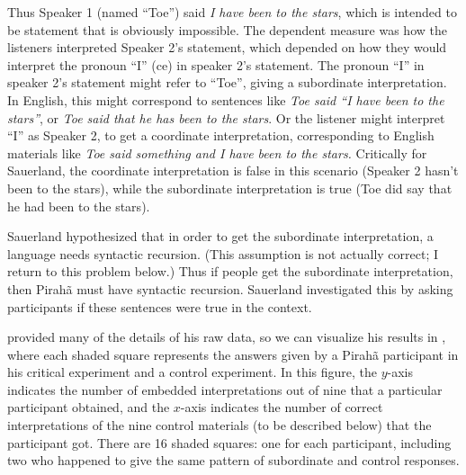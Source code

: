 \documentclass{article}
\begin{document}
Thus Speaker 1 (named ``Toe'') said \textit{I have been to the stars}, which is intended to be
statement that is obviously impossible. The dependent measure was how the listeners interpreted
Speaker 2's statement, which depended on how they would interpret the pronoun ``I'' (ce) in speaker
2’s statement. The pronoun ``I'' in speaker 2’s statement might refer to ``Toe'', giving  a
subordinate interpretation. In English, this might correspond to sentences like \textit{Toe said ``I
  have been to the stars''}, or \textit{Toe said that he has been to the stars}. Or the listener
might interpret ``I'' as Speaker 2, to get a coordinate interpretation, corresponding to English materials like \textit{Toe said something and I have been to the stars.}  Critically for Sauerland, the coordinate interpretation is false in this scenario (Speaker 2 hasn’t been to the stars), while the subordinate interpretation is true (Toe did say that he had been to the stars).

Sauerland hypothesized that in order to get the subordinate interpretation, a language needs syntactic recursion. (This assumption is not actually correct; I return to this problem below.) Thus if people get the subordinate interpretation, then Pirahã must have syntactic recursion. Sauerland investigated this by asking participants if these sentences were true in the context. 

\citet{sauerland2018false} provided many of the details of his raw data, so we can visualize his results in , where each shaded square represents the answers given by a Pirahã participant in his critical experiment and a control experiment. In this figure, the $y$-axis indicates the number of embedded interpretations out of nine that a particular participant obtained, and the $x$-axis indicates the number of correct interpretations of the nine control materials (to be described below) that the participant got. There are 16 shaded squares: one for each participant, including two who happened to give the same pattern of subordinate and control responses.
\end{document}
